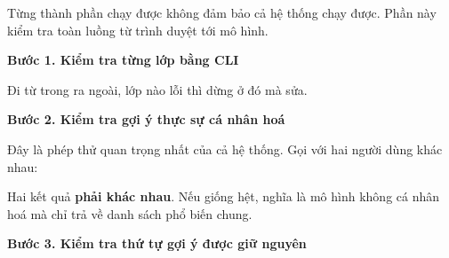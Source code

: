 Từng thành phần chạy được không đảm bảo cả hệ thống chạy được. Phần này
kiểm tra toàn luồng từ trình duyệt tới mô hình.

\vspace{0.5em}\noindent\textbf{Bước 1. Kiểm tra từng lớp bằng
CLI}\par

Đi từ trong ra ngoài, lớp nào lỗi thì dừng ở đó mà sửa.

\begin{Shaded}
\begin{Highlighting}[]


\DataTypeTok{\textbackslash{}}
   \OperatorTok{\textless{}}\OperatorTok{\textgreater{}}

 
\end{Highlighting}
\end{Shaded}

\vspace{0.5em}\noindent\textbf{Bước 2. Kiểm tra gợi ý thực sự cá nhân
hoá}\par

Đây là phép thử quan trọng nhất của cả hệ thống. Gọi với hai người dùng
khác nhau:

\begin{Shaded}
\begin{Highlighting}[]
 
 
\end{Highlighting}
\end{Shaded}

Hai kết quả \textbf{phải khác nhau}. Nếu giống hệt, nghĩa là mô hình
không cá nhân hoá mà chỉ trả về danh sách phổ biến chung.

\vspace{0.5em}\noindent\textbf{Bước 3. Kiểm tra thứ tự gợi ý được giữ
nguyên}\par

